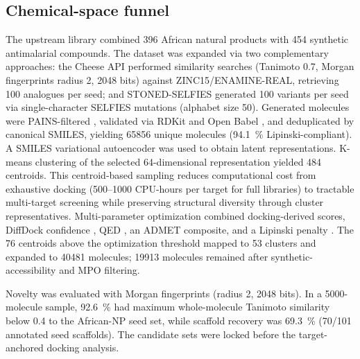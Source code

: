 \documentclass[journal=jcisd8,manuscript=article]{achemso}
\begin{document}
\subsection{Chemical-space funnel}\label{sec:methods_funnel}
The upstream library combined \num{396} African natural products with \num{454} synthetic antimalarial compounds. The dataset was expanded via two complementary approaches: the Cheese API \cite{lzicar_cheese_2024} performed similarity searches (Tanimoto \num{0.7}, Morgan fingerprints radius \num{2}, \num{2048} bits) against ZINC15/ENAMINE-REAL, retrieving \num{100} analogues per seed; and STONED-SELFIES \cite{Nigam2021} generated \num{100} variants per seed via single-character SELFIES mutations (alphabet size \num{50}). Generated molecules were PAINS-filtered \cite{Baell2010}, validated via RDKit and Open Babel \cite{OBoyle2011}, and deduplicated by canonical SMILES, yielding \num{65856} unique molecules (\qty{94.1}{\percent} Lipinski-compliant). A SMILES variational autoencoder \cite{gomez2018automatic} was used to obtain latent representations. K-means clustering of the selected 64-dimensional representation yielded \num{484} centroids. This centroid-based sampling reduces computational cost from exhaustive docking (\numrange{500}{1000} CPU-hours per target for full libraries) to tractable multi-target screening while preserving structural diversity through cluster representatives. Multi-parameter optimization combined docking-derived scores, DiffDock confidence \cite{Corso2023}, QED \cite{Bickerton2012}, an ADMET composite, and a Lipinski penalty \cite{Lipinski2004}. The \num{76} centroids above the optimization threshold mapped to \num{53} clusters and expanded to \num{40481} molecules; \num{19913} molecules remained after synthetic-accessibility and MPO filtering.

Novelty was evaluated with Morgan fingerprints \cite{Rogers2010} (radius \num{2}, \num{2048} bits). In a \num{5000}-molecule sample, \qty{92.6}{\percent} had maximum whole-molecule Tanimoto similarity below \num{0.4} to the African-NP seed set, while scaffold recovery was \qty{69.3}{\percent} (\num{70}/\num{101} annotated seed scaffolds). The candidate sets were locked before the target-anchored docking analysis.
\end{document}
